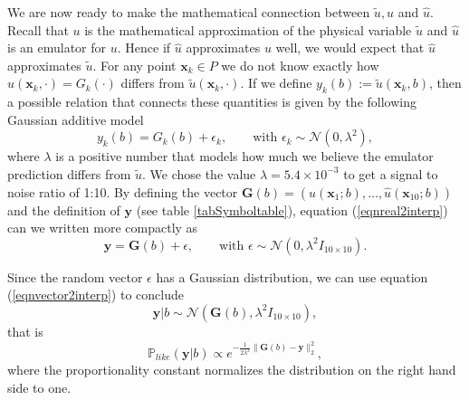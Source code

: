 \documentclass{sfuthesis}
\newcommand{\like}{\mathbb{P}_{like}}
\newcommand{\x}{\textbf{x}}
\newcommand{\y}{\textbf{y}}
\begin{document}
We are now ready to make the mathematical connection between $\tilde{u},u$ and $\hat{u}$. Recall
that $u$ is the mathematical approximation of the physical variable $\tilde{u}$ and $\hat{u}$
is an emulator for $u$. Hence if $\hat{u}$ approximates $u$ well, we would expect that 
$\hat{u}$ approximates $\tilde{u}$. For any point $\x_{k}\in P$ we do not know exactly
how  $\hat{u}(\x_{k},\cdot)=G_{k}(\cdot)$ differs from $\tilde{u}(\x_{k},\cdot)$.
If we define $y_{k}(b):=\tilde{u}(\x_{k},b)$, then a possible 
relation
that connects these quantities is given by the following Gaussian additive model \cite{Somersalo}
\begin{equation}\label{eqnreal2interp}
y_{k}(b)=G_{k}(b)+\epsilon_{k},\qquad\text{with } \epsilon_{k}\sim\mathcal{N}(0,\lambda^{2}),
\end{equation}
where $\lambda$ is  a positive number that models how much we believe  the emulator prediction differs from $\tilde{u}$. 
We chose the value $\lambda=5.4\times 10^{-3}$ to get a signal to noise ratio  of 1:10.
By defining the vector  
$\textbf{G}(b)=(\hat{u}(\x_{1};b),\ldots,\hat{u}(\x_{10};b))$ and  the definition of $\y$ 
(see table \ref{tabSymboltable}), equation (\ref{eqnreal2interp}) can we written more compactly as
\begin{equation}\label{eqnvector2interp}
\textbf{y}=\textbf{G}(b)+\epsilon,\qquad\text{with }\epsilon\sim\mathcal{N}(0,\lambda^{2} I_{10\times 10}).
\end{equation}


Since the random vector $\epsilon$ has a Gaussian distribution, we can use equation (\ref{eqnvector2interp})
to conclude 
\begin{equation*}
\textbf{y}|b\sim \mathcal{N}(\textbf{G}(b),\lambda^{2} I_{10\times 10}),
\end{equation*}
that is
\begin{equation}\label{eqnlikelihoodtoyproblem}
\like(\textbf{y}|b)\propto e^{-\frac{1}{2\lambda^{2}}\|\textbf{G}(b)-\textbf{y}\|_{2}^{2}},
\end{equation}
where the proportionality constant normalizes the distribution on the right hand side to one. 
\newline
\end{document}
